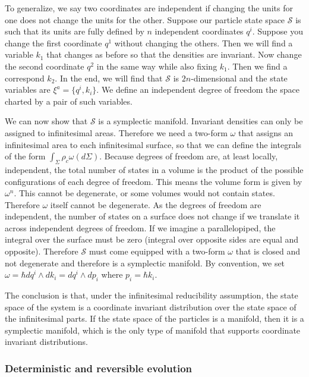 \documentclass[letterpaper]{article}
\begin{document}
To generalize, we say two coordinates are independent if changing the units for one does not change the units for the other. Suppose our particle state space $\mathcal{S}$ is such that its units are fully defined by $n$ independent coordinates $q^i$. Suppose you change the first coordinate $q^1$ without changing the others. Then we will find a variable $k_1$ that changes as before so that the densities are invariant. Now change the second coordinate $q^2$ in the same way while also fixing $k_1$. Then we find a correspond $k_2$. In the end, we will find that $\mathcal{S}$ is $2n$-dimensional and the state variables are $\xi^a = \{ q^i, k_i \}$. We define an independent degree of freedom the space charted by a pair of such variables.

We can now show that $\mathcal{S}$ is a symplectic manifold. Invariant densities can only be assigned to infinitesimal areas. Therefore we need a two-form $\omega$ that assigns an infinitesimal area to each infinitesimal surface, so that we can define the integrals of the form $\int_{\Sigma} \rho_c \omega(d\Sigma)$. Because degrees of freedom are, at least locally, independent, the total number of states in a volume is the product of the possible configurations of each degree of freedom. This means the volume form is given by $\omega^n$. This cannot be degenerate, or some volumes would not contain states. Therefore $\omega$ itself cannot be degenerate. As the degrees of freedom are independent, the number of states on a surface does not change if we translate it across independent degrees of freedom. If we imagine a parallelopiped, the integral over the surface must be zero (integral over opposite sides are equal and opposite). Therefore $\mathcal{S}$ must come equipped with a two-form $\omega$ that is closed and not degenerate and therefore is a symplectic manifold. By convention, we set $\omega = \hbar dq^i \wedge dk_i = dq^i \wedge dp_i$ where $p_i = \hbar k_i$.

The conclusion is that, under the infinitesimal reducibility assumption, the state space of the system is a coordinate invariant distribution over the state space of the infinitesimal parts. If the state space of the particles is a manifold, then it is a symplectic manifold, which is the only type of manifold that supports coordinate invariant distributions.

\subsubsection{Deterministic and reversible evolution}
\end{document}
